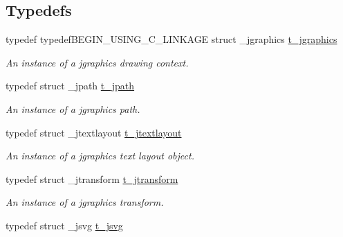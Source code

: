 \subsection*{Typedefs}
\begin{DoxyCompactItemize}
\item 
\hypertarget{group__jgraphics_ga4bf27bd7e21a59a427481b909d4656e7}{
typedef typedefBEGIN\_\-USING\_\-C\_\-LINKAGE struct \_\-jgraphics \hyperlink{group__jgraphics_ga4bf27bd7e21a59a427481b909d4656e7}{t\_\-jgraphics}}
\label{group__jgraphics_ga4bf27bd7e21a59a427481b909d4656e7}

\begin{DoxyCompactList}\small\item\em An instance of a jgraphics drawing context. \item\end{DoxyCompactList}\item 
\hypertarget{group__jgraphics_ga09a18e946c8a6cfa25dfa38154a138d8}{
typedef struct \_\-jpath \hyperlink{group__jgraphics_ga09a18e946c8a6cfa25dfa38154a138d8}{t\_\-jpath}}
\label{group__jgraphics_ga09a18e946c8a6cfa25dfa38154a138d8}

\begin{DoxyCompactList}\small\item\em An instance of a jgraphics path. \item\end{DoxyCompactList}\item 
\hypertarget{group__jgraphics_ga45f6bda6903290bd6040f79fec89872b}{
typedef struct \_\-jtextlayout \hyperlink{group__jgraphics_ga45f6bda6903290bd6040f79fec89872b}{t\_\-jtextlayout}}
\label{group__jgraphics_ga45f6bda6903290bd6040f79fec89872b}

\begin{DoxyCompactList}\small\item\em An instance of a jgraphics text layout object. \item\end{DoxyCompactList}\item 
\hypertarget{group__jgraphics_gaa936ddd5bfc6b091b730c834858326c2}{
typedef struct \_\-jtransform \hyperlink{group__jgraphics_gaa936ddd5bfc6b091b730c834858326c2}{t\_\-jtransform}}
\label{group__jgraphics_gaa936ddd5bfc6b091b730c834858326c2}

\begin{DoxyCompactList}\small\item\em An instance of a jgraphics transform. \item\end{DoxyCompactList}\item 
\hypertarget{group__jgraphics_gaa3000c3aa85e3d7c87f59c44d5d7ccab}{
typedef struct \_\-jsvg \hyperlink{group__jgraphics_gaa3000c3aa85e3d7c87f59c44d5d7ccab}{t\_\-jsvg}}
\label{group__jgraphics_gaa3000c3aa85e3d7c87f59c44d5d7ccab}


\end{DoxyCompactItemize}

